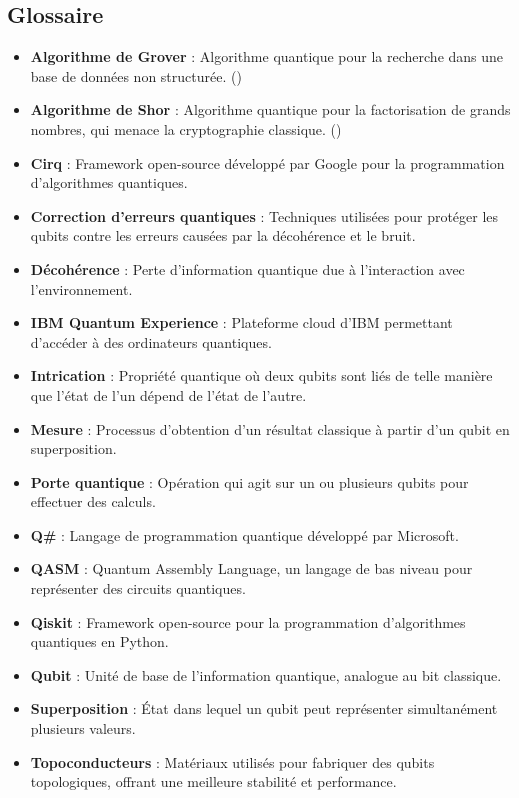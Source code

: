 \documentclass{article}
\begin{document}
\subsection{Glossaire}
\begin{itemize}
  \item \textbf{Algorithme de Grover} : Algorithme quantique pour la recherche dans une base de données non structurée. (\cite{wikipediaAlgorithmeGrover})
  \item \textbf{Algorithme de Shor} : Algorithme quantique pour la factorisation de grands nombres, qui menace la cryptographie classique. (\cite{wikipediaAlgorithmeShor})
  \item \textbf{Cirq} : Framework open-source développé par Google pour la programmation d'algorithmes quantiques.
  \item \textbf{Correction d'erreurs quantiques} : Techniques utilisées pour protéger les qubits contre les erreurs causées par la décohérence et le bruit.
  \item \textbf{Décohérence} : Perte d'information quantique due à l'interaction avec l'environnement.
  \item \textbf{IBM Quantum Experience} : Plateforme cloud d'IBM permettant d'accéder à des ordinateurs quantiques.
  \item \textbf{Intrication} : Propriété quantique où deux qubits sont liés de telle manière que l'état de l'un dépend de l'état de l'autre.
  \item \textbf{Mesure} : Processus d'obtention d'un résultat classique à partir d'un qubit en superposition.
  \item \textbf{Porte quantique} : Opération qui agit sur un ou plusieurs qubits pour effectuer des calculs.
  \item \textbf{Q\#} : Langage de programmation quantique développé par Microsoft.
  \item \textbf{QASM} : Quantum Assembly Language, un langage de bas niveau pour représenter des circuits quantiques.
  \item \textbf{Qiskit} : Framework open-source pour la programmation d'algorithmes quantiques en Python.
  \item \textbf{Qubit} : Unité de base de l'information quantique, analogue au bit classique.
  \item \textbf{Superposition} : État dans lequel un qubit peut représenter simultanément plusieurs valeurs.
  \item \textbf{Topoconducteurs} : Matériaux utilisés pour fabriquer des qubits topologiques, offrant une meilleure stabilité et performance.
\end{itemize}
\end{document}
